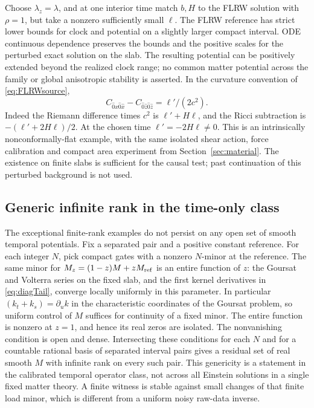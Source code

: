 Choose \(\lambda_z=\lambda\), and at one interior time match \(b,H\) to the FLRW solution with \(\rho=1\), but take a nonzero sufficiently small \(\ell\). The FLRW reference has strict lower bounds for clock and potential on a slightly larger compact interval. ODE continuous dependence preserves the bounds and the positive scales for the perturbed exact solution on the slab. The resulting potential can be positively extended beyond the realized clock range; no common matter potential across the family or global anisotropic stability is asserted. In the curvature convention of \eqref{eq:FLRWsource},
\[
 C_{\hat0\hat x\hat0\hat x}-C_{\hat0\hat z\hat0\hat z}
        =\ell'/(2c^2).
\]
Indeed the Riemann difference times \(c^2\) is \(\ell'+H\ell\), and the Ricci subtraction is \(-(\ell'+2H\ell)/2\). At the chosen time \(\ell'=-2H\ell\ne0\). This is an intrinsically nonconformally-flat example, with the same isolated shear action, force calibration and compact area experiment from Section~\ref{sec:material}. The existence on finite slabs is sufficient for the causal test; past continuation of this perturbed background is not used.

\subsection{Generic infinite rank in the time-only class}
The exceptional finite-rank examples do not persist on any open set of smooth temporal potentials. Fix a separated pair and a positive constant reference. For each integer \(N\), pick compact gates with a nonzero \(N\)-minor at the reference. The same minor for \(M_z=(1-z)M+zM_{\rm ref}\) is an entire function of \(z\): the Goursat and Volterra series on the fixed slab, and the first kernel derivatives in \eqref{eq:diagTail}, converge locally uniformly in this parameter. In particular \((k_t+k_s)=\partial_u k\) in the characteristic coordinates of the Goursat problem, so uniform control of \(M\) suffices for continuity of a fixed minor. The entire function is nonzero at \(z=1\), and hence its real zeros are isolated. The nonvanishing condition is open and dense. Intersecting these conditions for each \(N\) and for a countable rational basis of separated interval pairs gives a residual set of real smooth \(M\) with infinite rank on every such pair. This genericity is a statement in the calibrated temporal operator class, not across all Einstein solutions in a single fixed matter theory. A finite witness is stable against small changes of that finite load minor, which is different from a uniform noisy raw-data inverse.

